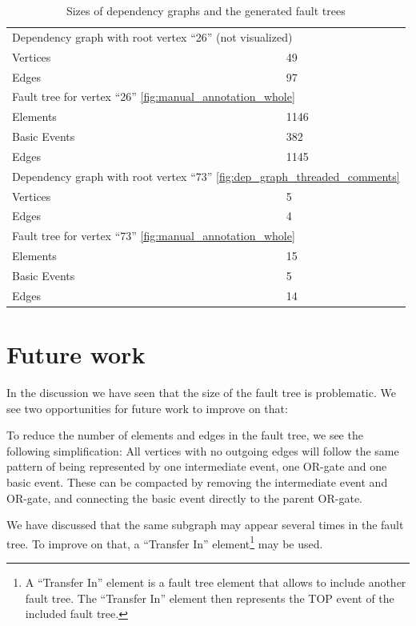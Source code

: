\begin{table}[!ht]
  \caption{Sizes of dependency graphs and the generated fault trees}
  \label{tab:qualitative_size_comparison}
  \begin{tabular}{ |l|l| }
    \hline
    \multicolumn{2}{|l|}{Dependency graph with root vertex ``26'' (not visualized)} \\
    Vertices & 49 \\
    Edges & 97 \\
    \hline
    \multicolumn{2}{|l|}{Fault tree for vertex ``26'' \autoref{fig:manual_annotation_whole}} \\
    Elements & 1146 \\
    Basic Events & 382 \\
    Edges & 1145 \\
    \hline
    \multicolumn{2}{|l|}{Dependency graph with root vertex ``73'' \autoref{fig:dep_graph_threaded_comments}} \\
    Vertices & 5 \\
    Edges & 4 \\
    \hline
    \multicolumn{2}{|l|}{Fault tree for vertex ``73'' \autoref{fig:manual_annotation_whole}} \\
    Elements & 15 \\
    Basic Events & 5 \\
    Edges & 14 \\
    \hline
  \end{tabular}
\end{table}


\section{Future work}

In the discussion we have seen that the size of the fault tree is problematic. We see two opportunities for future work to improve on that:
\begin{titemize}
  \item To reduce the number of elements and edges in the fault tree, we see the following simplification: All vertices with no outgoing edges will follow the same pattern of being represented by one intermediate event, one OR-gate and one basic event. These can be compacted by removing the intermediate event and OR-gate, and connecting the basic event directly to the parent OR-gate.
  \item We have discussed that the same subgraph may appear several times in the fault tree. To improve on that, a ``Transfer In'' element\footnote{A ``Transfer In'' element is a fault tree element that allows to include another fault tree. The ``Transfer In'' element then represents the TOP event of the included fault tree.} may be used.
\end{titemize}

